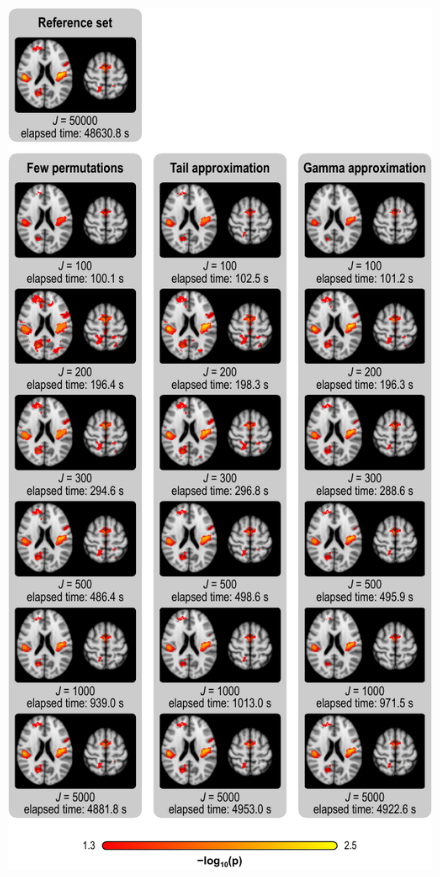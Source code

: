 \begin{figure}[!p]
\centering
\includegraphics[height=\textheight]{figures/vbm-tfce-fwep.pdf}
\label{fig:vbm-tfce-fwep_noref}
\end{figure}

